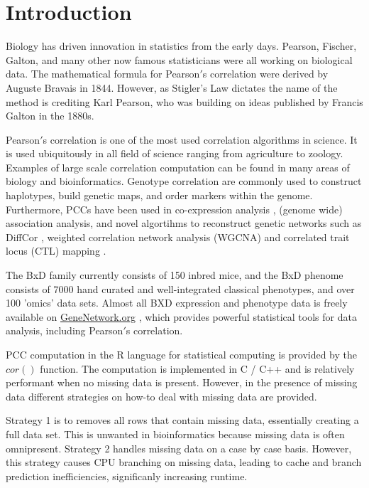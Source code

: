 \documentclass{bioinfo}
\begin{document}
\maketitle

\section{Introduction}
Biology has driven innovation in statistics from the early days. 
Pearson, Fischer, Galton, and many other now famous statisticians 
were all working on biological data. The mathematical formula 
for Pearson$'$s correlation were derived by Auguste Bravais in 1844. 
However, as Stigler's Law \citep{Stigler1980} dictates the name 
of the method is crediting Karl Pearson, who was building on 
ideas published by Francis Galton in the 1880s. 


Pearson$'$s correlation is one of the most used correlation algorithms in science. 
It is used ubiquitously in all field of science ranging from agriculture to 
zoology. Examples of large scale correlation computation can be found in many 
areas of biology and bioinformatics. Genotype correlation are commonly used to 
construct haplotypes, build genetic maps, and order markers within the genome. 
Furthermore, PCCs have been used in co-expression analysis \citep{Tesson:2010}, 
(genome wide) association analysis, and novel algortihms to reconstruct genetic 
networks such as DiffCor \citep{Fukushima:2013}, weighted correlation network 
analysis (WGCNA) \citep{Horvath:2008} and correlated trait locus (CTL) mapping 
\citep{Arends2016a}.

The BxD family currently consists of 150 inbred mice, and the BxD phenome consists 
of 7000 hand curated and well-integrated classical phenotypes, and over 100 'omics' 
data sets. Almost all BXD expression and phenotype data is freely available on 
\href{https://genenetwork.org/}{GeneNetwork.org} \citep{Sloan2016}, which provides 
powerful statistical tools for data analysis, including Pearson$'$s correlation.

PCC computation in the R language for statistical computing \citep{R:2005} is 
provided by the $cor()$ function. The computation is implemented in C / C++ and 
is relatively performant when no missing data is present. However, in the 
presence of missing data different strategies on how-to deal with missing data 
are provided. 

Strategy 1 is to removes all rows that contain missing data, essentially 
creating a full data set. This is unwanted in bioinformatics because missing 
data is often omnipresent. Strategy 2 handles missing data on a case by case 
basis. However, this strategy causes CPU branching on missing data, leading to 
cache and branch prediction inefficiencies, significanly increasing runtime.
\end{document}
